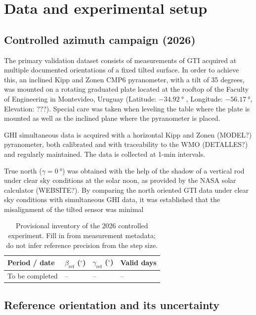 \section{Data and experimental setup}\label{sec:data}

\subsection{Controlled azimuth campaign (2026)}\label{subsec:campaign}
The primary validation dataset consists of measurements of GTI acquired at multiple documented orientations of a fixed tilted surface. In order to achieve this, an inclined Kipp and Zonen CMP6 pyranometer, with a tilt of 35 degrees, was mounted on a rotating graduated plate located at the rooftop of the Faculty of Engineering in Montevideo, Uruguay (Latitude: $ \SI{-34.92}{\degree}$ , Longitude: $ \SI{-56.17}{\degree}$, Elevation: ???).  Special care was taken when leveling the table where the plate is mounted as well as the inclined plane where the pyranometer is placed.

GHI simultaneous data is acquired with a horizontal Kipp and Zonen (MODEL?) pyranometer, both calibrated and with traceability to the WMO (DETALLES?) and regularly maintained. The data is collected at 1-min intervals.

True north ($\gamma = \SI{0}{\degree}$) was obtained with the help of the shadow of a vertical rod under clear sky conditions at the solar noon, as provided by the NASA solar calculator (WEBSITE?). 
By comparing the north oriented GTI data under clear sky conditions with simultaneous GHI data, it was established that the misalignment of the tilted sensor was minimal  


\begin{table}[t]
\centering
\caption{Provisional inventory of the 2026 controlled experiment. Fill in from
measurement metadata; do not infer reference precision from the step size.}
\label{tab:campaign}
\begin{tabular}{llll}
\toprule
Period / date & $\beta_{\mathrm{ref}}$ ($^\circ$) & $\gamma_{\mathrm{ref}}$ ($^\circ$) & Valid days \\
\midrule
To be completed & -- & -- & -- \\
\bottomrule
\end{tabular}
\end{table}

\subsection{Reference orientation and its uncertainty}
\label{subsec:reference}

